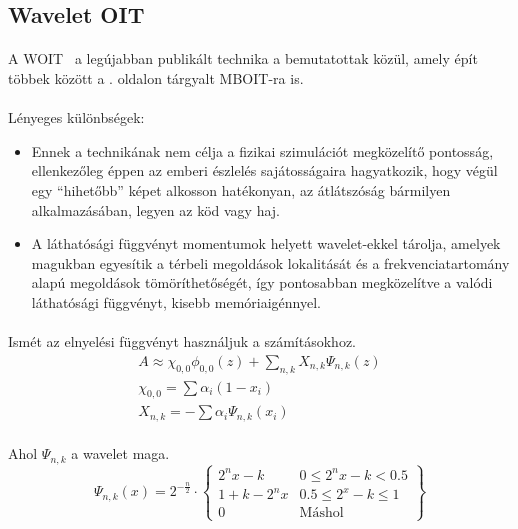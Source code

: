 \subsection{Wavelet OIT}
\paragraph{}A \ac{WOIT}~\cite{aizenshtein2022wavelettransparency} a legújabban publikált technika a bemutatottak közül, amely épít többek között a \pageref{sec:MBOIT}. oldalon tárgyalt \ac{MBOIT}-ra is.
\paragraph{}Lényeges különbségek:
\begin{itemize}
	\item Ennek a technikának nem célja a fizikai szimulációt megközelítő pontosság, ellenkezőleg éppen az emberi észlelés sajátosságaira hagyatkozik, hogy végül egy ``hihetőbb'' képet alkosson hatékonyan, az átlátszóság bármilyen alkalmazásában, legyen az köd vagy haj.
	\item A láthatósági függvényt momentumok helyett wavelet-ekkel \cite{Mallat2008Wavelets} tárolja, amelyek magukban egyesítik a térbeli megoldások lokalitását és a frekvenciatartomány alapú megoldások tömöríthetőségét, így pontosabban megközelítve a valódi láthatósági függvényt, kisebb memóriaigénnyel.
\end{itemize}

\paragraph{}Ismét az elnyelési függvényt használjuk a számításokhoz.
\begin{gather*}
	A \approx \chi_{0,0}\phi_{0,0}\left(z\right)+\sum_{n,k}X_{n,k}\Psi_{n,k}\left(z\right)\\
	\chi_{0,0} = \sum\alpha_i\left(1-x_i\right)\\
	X_{n,k} = - \sum\alpha_i\Psi_{n,k}(x_i)
\end{gather*}

\paragraph{}Ahol $\Psi_{n,k}$ a wavelet maga.
$$\Psi_{n,k}\left(x\right) = 2^{-\frac{n}{2}}\cdot\left\lbrace\begin{matrix}
	2^nx-k	& 0\leq2^nx-k<0.5\\
	1+k-2^nx	& 0.5\leq2^x-k\leq1\\
	0			& \textrm{Máshol}
\end{matrix}\right\rbrace$$

